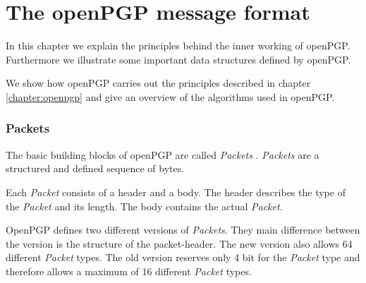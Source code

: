 \chapter{The openPGP message format} \label{chapter:messageformat}









In this chapter we explain the principles behind the inner working of openPGP. 
Furthermore we illustrate some important data structures defined by openPGP.  

We show how openPGP carries out the principles described in chapter \ref{chapter:openpgp} and give an overview of the algorithms used in openPGP.

\subsection{Packets}

The basic building blocks of openPGP are called \textit{Packets} \citep[section 4]{RFC4880}. \textit{Packets} are a structured and defined sequence of bytes.

Each \textit{Packet} consists of a header and a body. The header describes the type of the \textit{Packet} and its length. The body contains the actual \textit{Packet}.

OpenPGP defines two different versions of \textit{Packets}. They main difference between the version is the structure of the packet-header. The new version also allows 64 different \textit{Packet} types. The old version reserves only 4 bit for the \textit{Packet} type and therefore allows a maximum of 16 different \textit{Packet} types. \\

